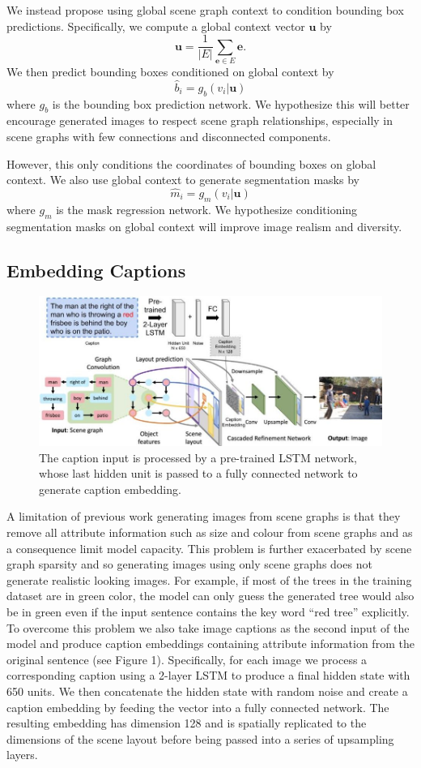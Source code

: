 \documentclass{article}
\newcommand{\vu}{\textbf{u}}
\newcommand{\ve}{\textbf{e}}
\begin{document}
We instead propose using global scene graph context to condition bounding box predictions. Specifically, we compute a global context vector $\vu$ by \[ \vu = \frac{1}{|E|}\sum_{\ve \in E} \ve .\]We then predict bounding boxes conditioned on global context by \[\hat{b}_i = g_b(v_i | \vu) \]where $g_b$ is the bounding box prediction network. We hypothesize this will better encourage generated images to respect scene graph relationships, especially in scene graphs with few connections and disconnected components.

However, this only conditions the coordinates of bounding boxes on global context. We also use global context to generate segmentation masks by \[ \hat{m}_i = g_m(v_i | \vu) \]where $g_m$ is the mask regression network. We hypothesize conditioning segmentation masks on global context will improve image realism and diversity.

\subsection{Embedding Captions}
\begin{figure}[H]
    \centering
    \includegraphics[width=\textwidth]{532Pres.jpeg}
    \caption{The caption input is processed by a pre-trained LSTM network, whose last hidden unit is passed to a fully connected network to generate caption embedding.}
    \label{fig:Model}
\end{figure}
A limitation of previous work generating images from scene graphs is that they remove all attribute information such as size and colour from scene graphs and as a consequence limit model capacity. This problem is further exacerbated by scene graph sparsity and so generating images using only scene graphs does not generate realistic looking images. For example, if most of the trees in the training dataset are in green color, the model can only guess the generated tree would also be in green even if the input sentence contains the key word “red tree” explicitly. To overcome this problem we also take image captions as the second input of the model and produce caption embeddings containing attribute information from the original sentence (see Figure 1). Specifically, for each image we process a corresponding caption using a 2-layer LSTM to produce a final hidden state with 650 units. We then concatenate the hidden state with random noise and create a caption embedding by feeding the vector into a fully connected network. The resulting embedding has dimension 128 and is spatially replicated to the dimensions of the scene layout before being passed into a series of upsampling layers.
\end{document}
